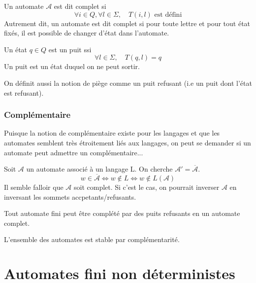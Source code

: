 \begin{definition}
    Un automate $\mathcal{A}$ est dit complet si 
        \[ \forall i \in Q, \forall l \in \Sigma, \quad T(i,l) \text{ est défini} \] 
    Autrement dit, un automate est dit complet si pour toute lettre et pour tout état fixés, il est possible de 
    changer d'état dans l'automate.  
\end{definition} 

\begin{definition}[Puit]
    Un état $q \in Q$ est un puit ssi 
        \[ \forall l \in \Sigma, \quad T(q,l) = q \]
    Un puit est un état duquel on ne peut sortir. 
\end{definition}

On définit aussi la notion de piège comme un puit refusant (i.e un puit dont l'état est refusant). 

\subsubsection{Complémentaire}

Puisque la notion de complémentaire existe pour les langages et que les automates semblent très étroitement liés 
aux langages, on peut se demander si un automate peut admettre un complémentaire... 

Soit $\mathcal{A}$ un automate associé à un langage L. On cherche $\mathcal{A}' = \overline{\mathcal{A}}$. 
    \[ w \in \overline{\mathcal{A}} \iff w \not \in L \iff w \not \in L(\mathcal{A}) \] 
Il semble falloir que $\mathcal{A}$ soit complet. Si c'est le cas, on pourrait inverser $\mathcal{A}$ en inversant 
les sommets accpetants/refusants. 

\begin{proposition}
    Tout automate fini peut être complété par des puits refusants en un automate complet. 
\end{proposition}

\begin{theorem}[Complémentarité]
    L'ensemble des automates est stable par complémentarité. 
\end{theorem}


\section{Automates fini non déterministes}

